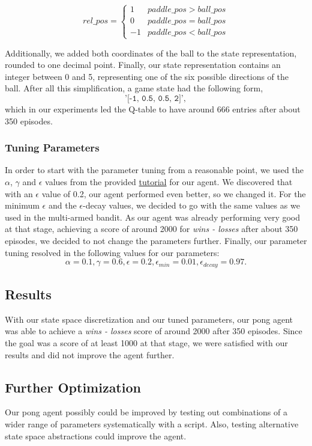 \documentclass[10pt]{article}
\begin{document}
    \[\mathit{rel\_pos} = \begin{cases}
                              1 & \mathit{paddle\_pos} > \mathit{ball\_pos} \\
                              0 & \mathit{paddle\_pos} = \mathit{ball\_pos} \\
                              -1 & \mathit{paddle\_pos} < \mathit{ball\_pos}
    \end{cases}
    \]

    Additionally, we added both coordinates of the ball to the state representation, rounded to one decimal point.
    Finally, our state representation contains an integer between 0 and 5, representing one of the six possible directions of the ball.
    After all this simplification, a game state had the following form,\[\texttt{'[-1, 0.5, 0.5, 2]'},\] which in our experiments led the Q-table to have around 666 entries after about 350 episodes.

    \subsubsection{Tuning Parameters}
    In order to start with the parameter tuning from a reasonable point, we used the $\alpha$, $\gamma$ and $\epsilon$ values from the provided \href{https://www.learndatasci.com/tutorials/reinforcement-q-learning-scratch-python-openai-gym/}{tutorial} for our agent.
    We discovered that with an $\epsilon$ value of 0.2, our agent performed even better, so we changed it.
    For the minimum $\epsilon$ and the $\epsilon$-decay values, we decided to go with the same values as we used in the multi-armed bandit.
    As our agent was already performing very good at that stage, achieving a score of around 2000 for \textit{wins - losses} after about 350 episodes, we decided to not change the parameters further.
    Finally, our parameter tuning resolved in the following values for our parameters:
    \[\alpha = 0.1, \gamma = 0.6, \epsilon = 0.2, \epsilon_\mathit{min} = 0.01, \epsilon_\mathit{decay} = 0.97.\]

    \subsection{Results}\label{subsec:pong-results}
    With our state space discretization and our tuned parameters, our pong agent was able to achieve a \textit{wins - losses} score of around 2000 after 350 episodes.
    Since the goal was a score of at least 1000 at that stage, we were satisfied with our results and did not improve the agent further.

    \subsection{Further Optimization}\label{subsec:pong-further-optimization}
    Our pong agent possibly could be improved by testing out combinations of a wider range of parameters systematically with a script.
    Also, testing alternative state space abstractions could improve the agent.
\end{document}

